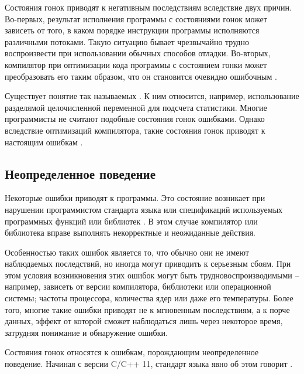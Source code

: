 Состояния гонок приводят к негативным последствиям вследствие двух причин.
Во-первых, результат исполнения программы с состояниями гонок может зависеть от того, в каком порядке инструкции программы исполняются различными потоками.
Такую ситуацию бывает чрезвычайно трудно воспроизвести при использовании обычных способов отладки.
Во-вторых, компилятор при оптимизации кода программы с состоянием гонки может преобразовать его таким образом, что он становится очевидно ошибочным \cite{data-race-theory}.

Существует понятие так называемых .
К ним относится, например, использование разделямой целочисленной переменной для подсчета статистики.
Многие программисты не считают подобные состояния гонок ошибками.
Однако вследствие оптимизаций компилятора, такие состояния гонок приводят к настоящим ошибкам \cite{data-race-theory}.


\subsection{Неопределенное поведение}

Некоторые ошибки приводят к  программы.
Это состояние возникает при нарушении программистом стандарта языка или спецификаций используемых программных функций или библиотек \cite{timur}.
В этом случае компилятор или библиотека вправе выполнять некорректные и неожиданные действия.

Особенностью таких ошибок является то, что обычно они не имеют наблюдаемых последствий, но иногда могут приводить к серьезным сбоям.
При этом условия возникновения этих ошибок могут быть трудновоспроизводимыми -- например, зависеть от версии компилятора, библиотеки или операционной системы; частоты процессора, количества ядер или даже его температуры.
Более того, многие такие ошибки приводят не к мгновенным последствиям, а к порче данных, эффект от которой сможет наблюдаться лишь через некоторое время, затрудняя понимание и обнаружение ошибки.

Состояния гонок относятся к ошибкам, порождающим неопределенное поведение.
Начиная с версии C/C++ 11, стандарт языка явно об этом говорит \cite{c++11-standard}.

